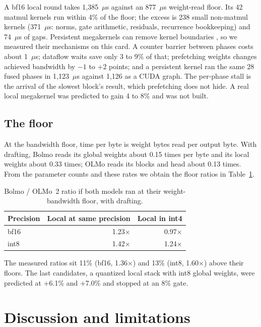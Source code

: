 \documentclass[11pt,a4paper]{article}
\newcommand{\x}{\ensuremath{\times}}
\begin{document}
A bf16 local round takes 1{,}385~$\mu$s against an 877~$\mu$s weight-read floor. Its 42 matmul kernels run within 4\% of the floor; the excess is 238 small non-matmul kernels (371~$\mu$s: norms, gate arithmetic, residuals, recurrence bookkeeping) and 74~$\mu$s of gaps. Persistent megakernels can remove kernel boundaries \citep{hazy2025megakernel,cheng2026mpk}, so we measured their mechanisms on this card. A counter barrier between phases costs about 1~$\mu$s; dataflow waits save only 3 to 9\% of that; prefetching weights changes achieved bandwidth by $-1$ to +2 points; and a persistent kernel ran the same 28 fused phases in 1{,}123~$\mu$s against 1{,}126 as a CUDA graph. The per-phase stall is the arrival of the slowest block's result, which prefetching does not hide. A real local megakernel was predicted to gain 4 to 8\% and was not built.

\subsection{The floor}

At the bandwidth floor, time per byte is weight bytes read per output byte. With drafting, Bolmo reads its global weights about 0.15 times per byte and its local weights about 0.33 times; OLMo reads its blocks and head about 0.13 times. From the parameter counts and these rates we obtain the floor ratios in Table~\ref{tab:floor}.

\begin{table}[htbp]
\centering
\caption{Bolmo / OLMo~2 ratio if both models ran at their weight-bandwidth floor, with drafting.}
\label{tab:floor}
\begin{tabular}{lrr}
\toprule
Precision & Local at same precision & Local in int4 \\
\midrule
bf16 & 1.23\x & 0.97\x \\
int8 & 1.42\x & 1.24\x \\
\bottomrule
\end{tabular}
\end{table}

The measured ratios sit 11\% (bf16, 1.36\x) and 13\% (int8, 1.60\x) above their floors. The last candidates, a quantized local stack with int8 global weights, were predicted at +6.1\% and +7.0\% and stopped at an 8\% gate.

\section{Discussion and limitations}
\end{document}
